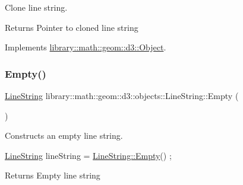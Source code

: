 Clone line string. 

\begin{DoxyReturn}{Returns}
Pointer to cloned line string 
\end{DoxyReturn}


Implements \hyperlink{classlibrary_1_1math_1_1geom_1_1d3_1_1_object_a1a784c6b359e0eb97cd34fabc42f2f3f}{library\+::math\+::geom\+::d3\+::\+Object}.

\mbox{\label{classlibrary_1_1math_1_1geom_1_1d3_1_1objects_1_1_line_string_ae9e05ddb3ab59060c78d18e19624f307}} 
\subsubsection{\texorpdfstring{Empty()}{Empty()}}
{\footnotesize\ttfamily \hyperlink{classlibrary_1_1math_1_1geom_1_1d3_1_1objects_1_1_line_string}{Line\+String} library\+::math\+::geom\+::d3\+::objects\+::\+Line\+String\+::\+Empty (\begin{DoxyParamCaption}{ }\end{DoxyParamCaption})\hspace{0.3cm}{\ttfamily [static]}}



Constructs an empty line string. 


\begin{DoxyCode}
\hyperlink{classlibrary_1_1math_1_1geom_1_1d3_1_1objects_1_1_line_string_aab80e60f34f06d4ab9f84f0e59aa389e}{LineString} lineString = \hyperlink{classlibrary_1_1math_1_1geom_1_1d3_1_1objects_1_1_line_string_ae9e05ddb3ab59060c78d18e19624f307}{LineString::Empty}() ;
\end{DoxyCode}


\begin{DoxyReturn}{Returns}
Empty line string 
\end{DoxyReturn}
\mbox{\label{classlibrary_1_1math_1_1geom_1_1d3_1_1objects_1_1_line_string_a83d9d9ba96fc956a900a7cd2dbf3e82b}} 
